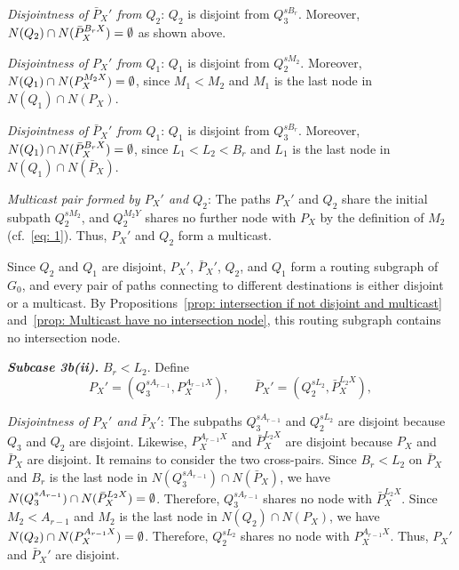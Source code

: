 \documentclass[11pt]{article}
\begin{document}
\par\vspace{0.4em}
\noindent\emph{Disjointness of \(\bar P_X'\) from \(Q_2\)}:
\(Q_2\) is disjoint from \(Q_3^{sB_r}\). Moreover, \(N(Q_2)\cap N(\bar P_X^{B_rX})=\nobreak\emptyset\) as shown above.

\par\vspace{0.4em}
\noindent\emph{Disjointness of \(P_X'\) from \(Q_1\)}:
\(Q_1\) is disjoint from \(Q_2^{sM_2}\). Moreover, \(N(Q_1)\cap N(P_X^{M_2X})=\nobreak\emptyset\), since \(M_1<M_2\) and \(M_1\) is the last node in \(N(Q_1)\cap N(P_X)\).

\par\vspace{0.4em}
\noindent\emph{Disjointness of \(\bar P_X'\) from \(Q_1\)}:
\(Q_1\) is disjoint from \(Q_3^{sB_r}\). Moreover, \(N(Q_1)\cap N(\bar P_X^{B_rX})=\nobreak\emptyset\), since \(L_1<L_2<B_r\) and \(L_1\) is the last node in \(N(Q_1)\cap N(\bar P_X)\).

\par\vspace{0.4em}
\noindent\emph{Multicast pair formed by \(P_X'\) and \(Q_2\)}:
The paths \(P_X'\) and \(Q_2\) share the initial subpath \(Q_2^{sM_2}\), and \(Q_2^{M_2Y}\) shares no further node with \(P_X\) by the definition of \(M_2\) (cf.~\eqref{eq: 1}). Thus, \(P_X'\) and \(Q_2\) form a multicast.

\par\vspace{0.6em}
\noindent Since \(Q_2\) and \(Q_1\) are disjoint, \(P_X'\), \(\bar P_X'\), \(Q_2\), and \(Q_1\) form a routing subgraph of \(G_0\), and every pair of paths connecting to different destinations is either disjoint or a multicast. By Propositions~\ref{prop: intersection if not disjoint and multicast} and~\ref{prop: Multicast have no intersection node}, this routing subgraph contains no intersection node.

\par\vspace{0.4em}
\noindent\textbf{\emph{Subcase 3b(ii).}}
\(B_r<L_2\). Define
\[
P_X'=(Q_3^{sA_{r-1}},P_X^{A_{r-1}X}),
\qquad
\bar P_X'=(Q_2^{sL_2},\bar P_X^{L_2X}),
\]
\par\vspace{0.4em}
\noindent\emph{Disjointness of \(P_X'\) and \(\bar P_X'\)}:
The subpaths \(Q_3^{sA_{r-1}}\) and \(Q_2^{sL_2}\) are disjoint because \(Q_3\) and \(Q_2\) are disjoint. Likewise, \(P_X^{A_{r-1}X}\) and \(\bar P_X^{L_2X}\) are disjoint because \(P_X\) and \(\bar P_X\) are disjoint. It remains to consider the two cross-pairs. Since \(B_r<L_2\) on \(\bar{P}_X\) and \(B_r\) is the last node in \(N(Q_3^{sA_{r-1}})\cap N(\bar P_X)\), we have \(N(Q_3^{sA_{r-1}})\cap N(\bar P_X^{L_2X})=\nobreak\emptyset\). Therefore, \(Q_3^{sA_{r-1}}\) shares no node with \(\bar P_X^{L_2X}\). Since \(M_2<A_{r-1}\) and \(M_2\) is the last node in \(N(Q_2)\cap N(P_X)\), we have \(N(Q_2)\cap N(P_X^{A_{r-1}X})=\nobreak\emptyset\). Therefore, \(Q_2^{sL_2}\) shares no node with \(P_X^{A_{r-1}X}\). Thus, \(P_X'\) and \(\bar P_X'\) are disjoint.
\end{document}
